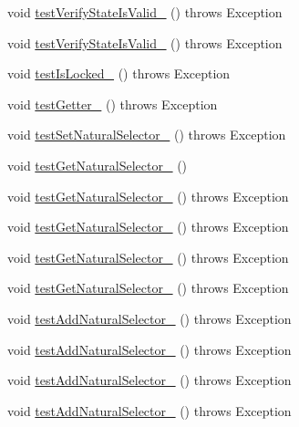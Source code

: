 \begin{DoxyCompactItemize}
void \hyperlink{classorg_1_1jgap_1_1_configuration_test_a5cf3f7feeee848be489b192ba88d756d}{test\-Verify\-State\-Is\-Valid\-\_} ()  throws Exception 
\item 
void \hyperlink{classorg_1_1jgap_1_1_configuration_test_a992c81e2dc76c40a42987f51dfec1863}{test\-Verify\-State\-Is\-Valid\-\_} ()  throws Exception 
\item 
void \hyperlink{classorg_1_1jgap_1_1_configuration_test_abc8ca9e4b0da1020611ad53d91900098}{test\-Is\-Locked\-\_} ()  throws Exception 
\item 
void \hyperlink{classorg_1_1jgap_1_1_configuration_test_a17752be2dd0b9da193f931c86406dbbf}{test\-Getter\-\_} ()  throws Exception 
\item 
void \hyperlink{classorg_1_1jgap_1_1_configuration_test_a31778b842098c79d1b029b752e6d3a4a}{test\-Set\-Natural\-Selector\-\_} ()  throws Exception 
\item 
void \hyperlink{classorg_1_1jgap_1_1_configuration_test_ac4cc779463a8f88449c300c170a6c294}{test\-Get\-Natural\-Selector\-\_} ()
\item 
void \hyperlink{classorg_1_1jgap_1_1_configuration_test_a06d66d7c6cd7ac4eae16b40251ec1a29}{test\-Get\-Natural\-Selector\-\_} ()  throws Exception 
\item 
void \hyperlink{classorg_1_1jgap_1_1_configuration_test_ae5d01d5838938a8f6a8f93d45e8894ee}{test\-Get\-Natural\-Selector\-\_} ()  throws Exception 
\item 
void \hyperlink{classorg_1_1jgap_1_1_configuration_test_af6b357b64bde0f3ec5a23a33b41e960d}{test\-Get\-Natural\-Selector\-\_} ()  throws Exception 
\item 
void \hyperlink{classorg_1_1jgap_1_1_configuration_test_aa9fc9a3ba2570fc8e91efd019148763a}{test\-Get\-Natural\-Selector\-\_} ()  throws Exception 
\item 
void \hyperlink{classorg_1_1jgap_1_1_configuration_test_a9e0d128e5aa9b9b02efa0fb2241b8709}{test\-Add\-Natural\-Selector\-\_} ()  throws Exception 
\item 
void \hyperlink{classorg_1_1jgap_1_1_configuration_test_af8f0119b62b5191c9f3f7432b4d197dc}{test\-Add\-Natural\-Selector\-\_} ()  throws Exception 
\item 
void \hyperlink{classorg_1_1jgap_1_1_configuration_test_ad2bd8ec011baca9bac3e5e0202abbfff}{test\-Add\-Natural\-Selector\-\_} ()  throws Exception 
\item 
void \hyperlink{classorg_1_1jgap_1_1_configuration_test_ac0fb972b6561c12cac28250f36559393}{test\-Add\-Natural\-Selector\-\_} ()  throws Exception 

\end{DoxyCompactItemize}
